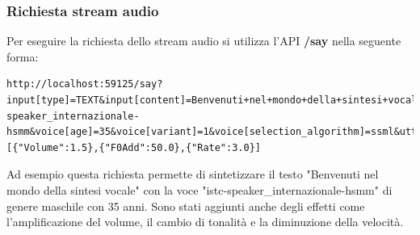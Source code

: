 \subsubsection{Richiesta stream audio}
Per eseguire la richiesta dello stream audio si utilizza l'API \textbf{/say} nella seguente forma:
\lstset{language=html,
		basicstyle=\ttfamily,
		columns=fullflexible,
		showstringspaces=false,
		breaklines=true }
\begin{lstlisting}
http://localhost:59125/say?input[type]=TEXT&input[content]=Benvenuti+nel+mondo+della+sintesi+vocale.&input[locale]=it&output[type]=AUDIO&output[format]=WAVE_FILE&voice[gender]=male&voice[name]=istc-speaker_internazionale-hsmm&voice[age]=35&voice[variant]=1&voice[selection_algorithm]=ssml&utterance[effects]=[{"Volume":1.5},{"F0Add":50.0},{"Rate":3.0}]
\end{lstlisting}
Ad esempio questa richiesta permette di sintetizzare il testo "Benvenuti nel mondo della sintesi vocale" con la voce "istc-speaker\_internazionale-hsmm" di genere maschile con 35 anni.
Sono stati aggiunti anche degli effetti come l'amplificazione del volume, il cambio di tonalità e la diminuzione della velocità.
